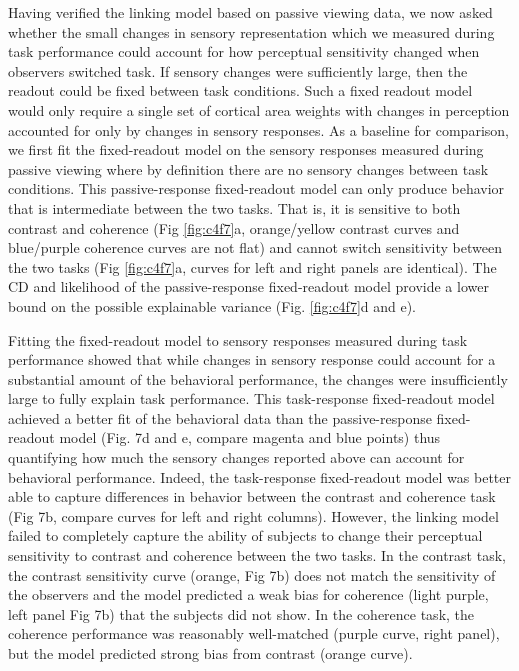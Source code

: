 \documentclass{report}
\begin{document}
Having verified the linking model based on passive viewing data, we now asked whether the small changes in sensory representation which we measured during task performance could account for how perceptual sensitivity changed when observers switched task. If sensory changes were sufficiently large, then the readout could be fixed between task conditions. Such a fixed readout model would only require a single set of cortical area weights with changes in perception accounted for only by changes in sensory responses. 
As a baseline for comparison, we first fit the fixed-readout model on the sensory responses measured during passive viewing where by definition there are no sensory changes between task conditions. This passive-response fixed-readout model can only produce behavior that is intermediate between the two tasks. That is, it is sensitive to both contrast and coherence (Fig \ref{fig:c4f7}a, orange/yellow contrast curves and blue/purple coherence curves are not flat) and cannot switch sensitivity between the two tasks (Fig \ref{fig:c4f7}a, curves for left and right panels are identical).  The CD and likelihood of the passive-response fixed-readout model provide a lower bound on the possible explainable variance (Fig. \ref{fig:c4f7}d and e). 

Fitting the fixed-readout model to sensory responses measured during task performance showed that while changes in sensory response could account for a substantial amount of the behavioral performance, the changes were insufficiently large to fully explain task performance. This task-response fixed-readout model achieved a better fit of the behavioral data than the passive-response fixed-readout model (Fig. 7d and e, compare magenta and blue points) thus quantifying how much the sensory changes reported above can account for behavioral performance. Indeed, the task-response fixed-readout model was better able to capture differences in behavior between the contrast and coherence task (Fig 7b, compare curves for left and right columns). However, the linking model failed to completely capture the ability of subjects to change their perceptual sensitivity to contrast and coherence between the two tasks. In the contrast task, the contrast sensitivity curve (orange, Fig 7b) does not match the sensitivity of the observers and the model predicted a weak bias for coherence (light purple, left panel Fig 7b) that the subjects did not show. In the coherence task, the coherence performance was reasonably well-matched (purple curve, right panel), but the model predicted strong bias from contrast (orange curve).
\end{document}
